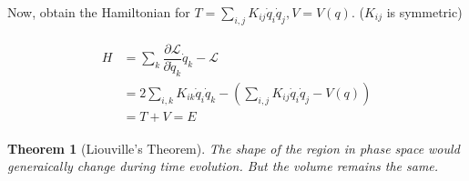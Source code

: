 \documentclass[final]{IEEEphot}
\newtheorem{theorem}{Theorem}[section]
\newcommand{\PD}[2]{\dfrac{\partial #1}{\partial #2}} %
\newcommand{\q}{\dot{q}}
\renewcommand{\L}{\mathcal{L}} %
\newcommand{\BKS}[1]{\left( #1 \right)} %
\newcommand{\VS}{\vspace{0.3cm}} %
\begin{document}
\VS

Now, obtain the Hamiltonian for $ T = \sum_{i,j} K_{ij}\q_i \q_j , V = V(q)$. ($K_{ij}$ is symmetric)

\begin{gather}
 \begin{split}
  H & = \sum_k \PD{\L}{\q_k}\q_k - \L \\
     & = 2 \sum_{i,k} K_{ik} \q_i \q_k - \BKS{ \sum_{i,j} K_{ij} \q_i \q_j - V(q) } \\
     & = T + V = E
 \end{split}
\end{gather}

\newpage

\begin{theorem}[Liouville's Theorem]
 The shape of the region in phase space would generaically change during time evolution. But the volume remains the same.
\end{theorem}

\VS
\end{document}
